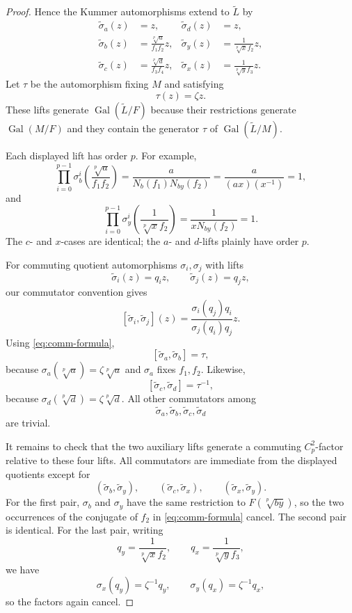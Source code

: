 \documentclass[10pt,a4paper]{amsart}
\DeclareMathOperator{\Gal}{Gal}
\begin{document}
\begin{proof}
Hence the Kummer automorphisms extend to $\widetilde L$ by
\begin{align*}
 \widetilde\sigma_a(z)&=z,
 &\widetilde\sigma_d(z)&=z,\\
 \widetilde\sigma_b(z)&=\frac{\sqrt[p]{a}}{f_1f_2}z,
 &\widetilde\sigma_y(z)&=\frac{1}{\sqrt[p]{x}f_2}z,\\
 \widetilde\sigma_c(z)&=\frac{\sqrt[p]{d}}{f_3f_4}z,
 &\widetilde\sigma_x(z)&=\frac{1}{\sqrt[p]{y}f_3}z.
\end{align*}
Let $\tau$ be the automorphism fixing $M$ and satisfying
\[
 \tau(z)=\zeta z.
\]
These lifts generate $\Gal(\widetilde L/F)$ because their restrictions
generate $\Gal(M/F)$ and they contain the generator $\tau$ of
$\Gal(\widetilde L/M)$.

Each displayed lift has order $p$. For example,
\[
 \prod_{i=0}^{p-1}\sigma_b^i
 \left(\frac{\sqrt[p]{a}}{f_1f_2}\right)
 =\frac{a}{N_b(f_1)N_{by}(f_2)}
 =\frac{a}{(ax)(x^{-1})}=1,
\]
and
\[
 \prod_{i=0}^{p-1}\sigma_y^i
 \left(\frac{1}{\sqrt[p]{x}f_2}\right)
 =\frac{1}{xN_{by}(f_2)}=1.
\]
The $c$- and $x$-cases are identical; the $a$- and $d$-lifts plainly have
order $p$.

For commuting quotient automorphisms $\sigma_i,\sigma_j$ with lifts
\[
 \widetilde\sigma_i(z)=q_i z,
 \qquad
 \widetilde\sigma_j(z)=q_j z,
\]
our commutator convention gives
\begin{equation}\label{eq:comm-formula}
 [\widetilde\sigma_i,\widetilde\sigma_j](z)
 =\frac{\sigma_i(q_j)q_i}{\sigma_j(q_i)q_j}z.
\end{equation}
Using \eqref{eq:comm-formula},
\[
 [\widetilde\sigma_a,\widetilde\sigma_b]=\tau,
\]
because $\sigma_a(\sqrt[p]{a})=\zeta\sqrt[p]{a}$ and $\sigma_a$ fixes
$f_1,f_2$. Likewise,
\[
 [\widetilde\sigma_c,\widetilde\sigma_d]=\tau^{-1},
\]
because $\sigma_d(\sqrt[p]{d})=\zeta\sqrt[p]{d}$.
All other commutators among
\[
 \widetilde\sigma_a,\widetilde\sigma_b,
 \widetilde\sigma_c,\widetilde\sigma_d
\]
are trivial.

It remains to check that the two auxiliary lifts generate a commuting
$C_p^2$-factor relative to these four lifts. All commutators are immediate
from the displayed quotients except for
\[
 (\widetilde\sigma_b,\widetilde\sigma_y),\qquad
 (\widetilde\sigma_c,\widetilde\sigma_x),\qquad
 (\widetilde\sigma_x,\widetilde\sigma_y).
\]
For the first pair, $\sigma_b$ and $\sigma_y$ have the same restriction to
$F(\sqrt[p]{by})$, so the two occurrences of the conjugate of $f_2$ in
\eqref{eq:comm-formula} cancel. The second pair is identical. For the last
pair, writing
\[
 q_y=\frac{1}{\sqrt[p]{x}f_2},
 \qquad
 q_x=\frac{1}{\sqrt[p]{y}f_3},
\]
we have
\[
 \sigma_x(q_y)=\zeta^{-1}q_y,
 \qquad
 \sigma_y(q_x)=\zeta^{-1}q_x,
\]
so the factors again cancel.


\end{proof}
\end{document}
